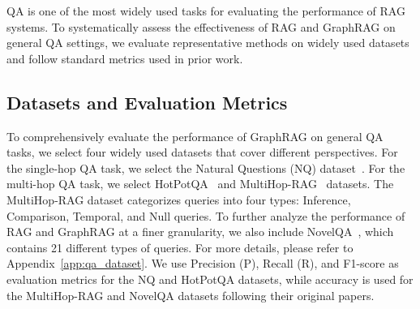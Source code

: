 QA is one of the most widely used tasks for evaluating the performance of RAG systems. To systematically assess the effectiveness of RAG and GraphRAG on general QA settings, we evaluate representative methods on widely used datasets and follow standard metrics used in prior work.

\subsection{Datasets and Evaluation Metrics}
To comprehensively evaluate the performance of GraphRAG on general QA tasks, we select four widely used datasets that cover different perspectives. For the single-hop QA task, we select the Natural Questions (NQ) dataset~\cite{kwiatkowski2019natural}. 
For the multi-hop QA task, we select HotPotQA~\cite{yang2018hotpotqa} and MultiHop-RAG~\cite{tang2024multihop} datasets. 
The MultiHop-RAG dataset categorizes queries into four types: Inference, Comparison, Temporal, and Null queries. To further analyze the performance of RAG and GraphRAG at a finer granularity, we also include NovelQA~\cite{wang2024novelqa}, which contains 21 different types of queries. For more details, please refer to Appendix~\ref{app:qa_dataset}.
We use Precision (P), Recall (R), and F1-score as evaluation metrics for the NQ and HotPotQA datasets, while accuracy is used for the MultiHop-RAG and NovelQA datasets following their original papers.
